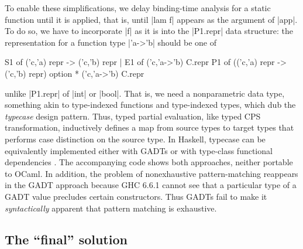 To enable these simplifications, we delay binding-time analysis
for a static function until it is applied, that is, until |lam f|
appears as the argument of |app|.  To do so, we have to incorporate |f|
as it is into the |P1.repr| data structure: the representation
for a function type |'a->'b| should be one of
\begin{code3}
S1 of ('c,'a) repr -> ('c,'b) repr | E1 of ('c,'a->'b) C.repr
P1 of (('c,'a) repr -> ('c,'b) repr) option * ('c,'a->'b) C.repr
\end{code3}
unlike |P1.repr| of |int| or |bool|.
That is, we need a nonparametric data type, something akin to
type-indexed functions and type-indexed types, which
\citet{oliveira-typecase} dub the \emph{typecase} design pattern.
Thus, typed partial evaluation, like typed CPS transformation,
inductively defines a map from source types to target types that
performs case distinction on the source type. In Haskell, typecase
can be equivalently implemented either with GADTs or with
type-class functional dependencies
\citep{oliveira-typecase}. The accompanying code shows both
approaches, neither portable to OCaml. In addition,
the problem of nonexhaustive pattern\hyp matching reappears in
the GADT approach because GHC 6.6.1 cannot see that a particular
type of a GADT value precludes certain constructors.
Thus GADTs fail to
make it \emph{syntactically} apparent that pattern matching is exhaustive.


\subsection{The ``final'' solution}
\label{S:PE-solution}

